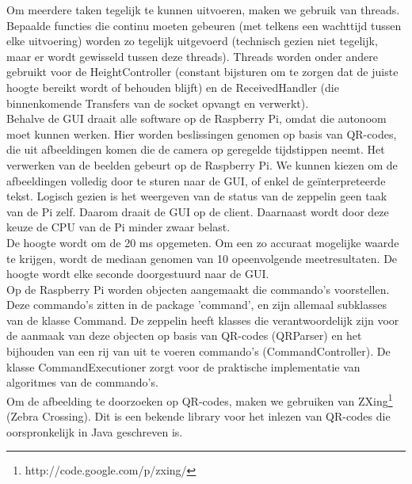 \documentclass[eind]{penoverslag}
\begin{document}
Om meerdere taken tegelijk te kunnen uitvoeren, maken we gebruik van threads. Bepaalde functies die continu moeten gebeuren (met telkens een wachttijd tussen elke uitvoering) worden zo tegelijk uitgevoerd (technisch gezien niet tegelijk, maar er wordt gewisseld tussen deze threads). Threads worden onder andere gebruikt voor de HeightController (constant bijsturen om te zorgen dat de juiste hoogte bereikt wordt of behouden blijft) en de ReceivedHandler (die binnenkomende Transfers van de socket opvangt en verwerkt). \\

Behalve de GUI draait alle software op de Raspberry Pi, omdat die autonoom moet kunnen werken. Hier worden beslissingen genomen op basis van QR-codes, die uit afbeeldingen komen die de camera op geregelde tijdstippen neemt. Het verwerken van de beelden gebeurt op de Raspberry Pi. We kunnen kiezen om de afbeeldingen volledig door te sturen naar de GUI, of enkel de ge\"interpreteerde tekst. Logisch gezien is het weergeven van de status van de zeppelin geen taak van de Pi zelf. Daarom draait de GUI op de client. Daarnaast wordt door deze keuze de CPU van de Pi minder zwaar belast. \\

De hoogte wordt om de 20 ms opgemeten. Om een zo accuraat mogelijke waarde te krijgen, wordt de mediaan genomen van 10 opeenvolgende meetresultaten. De hoogte wordt elke seconde doorgestuurd naar de GUI. \\

Op de Raspberry Pi worden objecten aangemaakt die commando's voorstellen. Deze commando's zitten in de package 'command', en zijn allemaal subklasses van de klasse Command. De zeppelin heeft klasses die verantwoordelijk zijn voor de aanmaak van deze objecten op basis van QR-codes (QRParser) en het bijhouden van een rij van uit te voeren commando's (CommandController). De klasse CommandExecutioner zorgt voor de praktische implementatie van algoritmes van de commando's. \\

Om de afbeelding te doorzoeken op QR-codes, maken we gebruiken van ZXing\footnote{http://code.google.com/p/zxing/} (Zebra Crossing). Dit is een bekende library voor het inlezen van QR-codes die oorspronkelijk in Java geschreven is. \\
\end{document}
